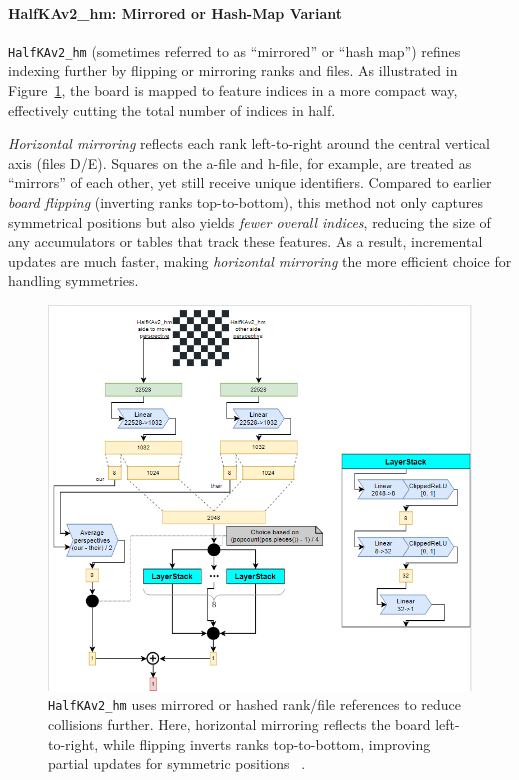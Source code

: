 \documentclass[12pt,a4paper]{article}
\begin{document}
\paragraph{HalfKAv2\_hm: Mirrored or Hash-Map Variant}
\label{sec:halfkav2_hm}

\texttt{HalfKAv2\_hm} (sometimes referred to as “mirrored” or “hash map”) refines
indexing further by flipping or mirroring ranks and files. As illustrated in
Figure~\ref{fig:halfkav2_hm}, the board is mapped to feature indices in a more
compact way, effectively cutting the total number of indices in half. 

\medskip

\noindent
\emph{Horizontal mirroring} reflects each rank left-to-right around the
central vertical axis (files D/E). Squares on the a-file and h-file, for
example, are treated as “mirrors” of each other, yet still receive unique
identifiers. Compared to earlier \emph{board flipping} (inverting ranks
top-to-bottom), this method not only captures symmetrical positions but also
yields \emph{fewer overall indices}, reducing the size of any accumulators or
tables that track these features. As a result, incremental updates are much
faster, making \emph{horizontal mirroring} the more efficient choice for
handling symmetries.


\begin{figure}[H]
    \centering
    \includegraphics[width=1\textwidth]{figures/1.png}
    \caption{\texttt{HalfKAv2\_hm} uses mirrored or hashed rank/file references 
    to reduce collisions further. Here, horizontal mirroring reflects the board 
    left-to-right, while flipping inverts ranks top-to-bottom, improving partial 
    updates for symmetric positions ~\cite{githubdocs}.}
    \label{fig:halfkav2_hm}
\end{figure}
\end{document}
